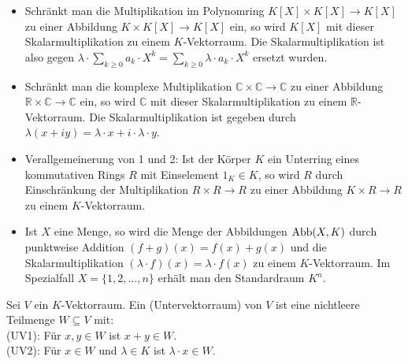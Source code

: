 \begin{example}
	\begin{itemize}
		\item Schränkt man die Multiplikation im Polynomring $K[X] \times K[X] \to K[X]$ zu einer Abbildung $K \times K[X]
		\to K[X]$ ein, so wird $K[X]$ mit dieser Skalarmultiplikation zu einem $K$-Vektorraum. Die Skalarmultiplikation ist also
		gegen $\lambda\cdot \sum _{k\ge 0} a_k\cdot X^k = \sum _{k\ge 0} \lambda\cdot a_k\cdot X^k$ ersetzt
		wurden.
		\item Schränkt man die komplexe Multiplikation $\mathbb C \times \mathbb C \to \mathbb C$ zu einer Abbildung 
		$\mathbb R \times \mathbb C \to \mathbb C$ ein, so wird $\mathbb C$ mit dieser Skalarmultiplikation zu einem
		$\mathbb R$-Vektorraum. Die Skalarmultiplikation ist gegeben durch $\lambda(x+iy)=\lambda\cdot x + i\cdot\lambda\cdot y$.
		\item Verallgemeinerung von 1 und 2: Ist der Körper $K$ ein Unterring eines kommutativen Rings $R$ mit Einselement 
		$1_K \in K$, so wird $R$ durch Einschränkung der Multiplikation $R \times R \to R$ zu einer Abbildung $K \times R
		\to R$ zu einem $K$-Vektorraum.
		\item Ist $X$ eine Menge, so wird die Menge der Abbildungen $\operatorname{Abb}(X,K)$ durch punktweise Addition $(f+g)(x)=f(x)+
		g(x)$ und die Skalarmultiplikation $(\lambda\cdot f)(x)=\lambda\cdot f(x)$ zu einem $K$-Vektorraum. Im Spezialfall
		$X=\{1,2,...,n\}$ erhält man den Standardraum $K^n$.
	\end{itemize}
\end{example}

\begin{definition}[Untervektorraum]
	Sei $V$ ein $K$-Vektorraum. Ein  (Untervektorraum) von $V$ ist eine nichtleere
	Teilmenge $W \subseteq V$ mit: \\
	(UV1): Für $x,y \in W$ ist $x+y\in W$. \\
	(UV2): Für $x \in W$ und $\lambda \in K$ ist $\lambda\cdot x\in W$.
\end{definition}

